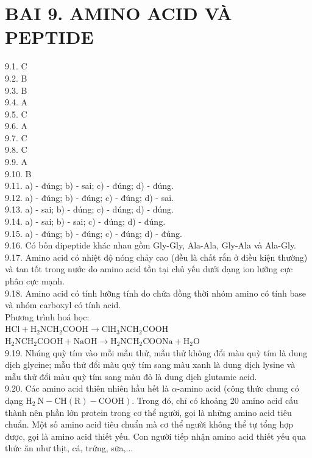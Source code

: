 \documentclass[10pt]{article}
\begin{document}
\section*{BAI 9. AMINO ACID VÀ PEPTIDE}
9.1. C\\
9.2. B\\
9.3. B\\
9.4. A\\
9.5. C\\
9.6. A\\
9.7. C\\
9.8. C\\
9.9. A\\
9.10. B\\
9.11. a) - đúng; b) - sai; c) - đúng; d) - đúng.\\
9.12. a) - đúng; b) - đúng; c) - đúng; d) - sai.\\
9.13. a) - sai; b) - đúng; c) - đúng; d) - đúng.\\
9.14. a) - sai; b) - sai; c) - đúng; d) - đúng.\\
9.15. a) - đúng; b) - đúng; c) - đúng; d) - đúng.\\
9.16. Có bốn dipeptide khác nhau gồm Gly-Gly, Ala-Ala, Gly-Ala và Ala-Gly.\\
9.17. Amino acid có nhiệt độ nóng chảy cao (đều là chất rắn ở điều kiện thường) và tan tốt trong nước do amino acid tồn tại chủ yếu dưới dạng ion lưỡng cực phân cực mạnh.\\
9.18. Amino acid có tính lưỡng tính do chứa đồng thời nhóm amino có tính base và nhóm carboxyl có tính acid.\\
Phương trình hoá học:\\
$\mathrm{HCl}+\mathrm{H}_{2} \mathrm{NCH}_{2} \mathrm{COOH} \longrightarrow \mathrm{ClH}_{3} \mathrm{NCH}_{2} \mathrm{COOH}$\\
$\mathrm{H}_{2} \mathrm{NCH}_{2} \mathrm{COOH}+\mathrm{NaOH} \longrightarrow \mathrm{H}_{2} \mathrm{NCH}_{2} \mathrm{COONa}+\mathrm{H}_{2} \mathrm{O}$\\
9.19. Nhúng quỳ tím vào mỗi mẫu thử, mẫu thử không đổi màu quỳ tím là dung dịch glycine; mẫu thử đổi màu quỳ tím sang màu xanh là dung dịch lysine và mẫu thử đổi màu quỳ tím sang màu đỏ là dung dịch glutamic acid.\\
9.20. Các amino acid thiên nhiên hầu hết là $\alpha$-amino acid (công thức chung có dạng $\left.\mathrm{H}_{2} \mathrm{~N}-\mathrm{CH}(\mathrm{R})-\mathrm{COOH}\right)$. Trong đó, chỉ có khoảng 20 amino acid cấu thành nên phần lớn protein trong cơ thể người, gọi là những amino acid tiêu chuẩn. Một số amino acid tiêu chuẩn mà cơ thể người không thể tự tổng hợp được, gọi là amino acid thiết yếu. Con người tiếp nhận amino acid thiết yếu qua thức ăn như thịt, cá, trứng, sữa,...\\
\end{document}
